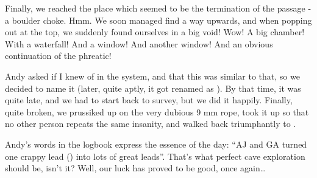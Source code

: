 Finally, we reached the place which seemed to be the termination of the
passage - a boulder choke. Hmm. We soon managed find a way upwards, and
when popping out at the top, we suddenly found ourselves in a big void!
Wow! A big chamber! With a waterfall! And a window! And another window!
And an obvious continuation of the phreatic!

Andy asked if I knew of  in the system, and that
this was similar to that, so we decided to name it  (later, quite aptly, it got renamed as ). By
that time, it was quite late, and we had to start back to survey, but we
did it happily. Finally, quite broken, we prussiked up on the very
dubious 9 mm rope, took it up so that no other person repeats the same
insanity, and walked back triumphantly to .


Andy's words in the logbook express the essence of the day: ``AJ and GA
turned one crappy lead () into lots of great leads''.
That's what perfect cave exploration should be, isn't it? Well, our luck
has proved to be good, once again\ldots{}






